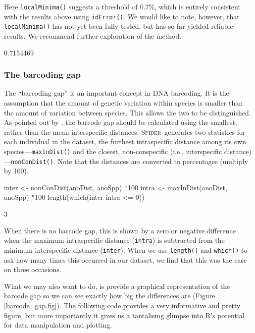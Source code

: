 \documentclass{article}
\newcommand{\spider}{\textsc{Spider}~} %
\newcommand{\fun}[1]{\texttt{#1}}
\begin{document}
Here \fun{localMinima()} suggests a threshold of 0.7\%, which is entirely consistent with the results above using \fun{idError()}. We would like to note, however, that \fun{localMinima()} has not yet been fully tested, but has so far yielded reliable results. We recommend further exploration of the method.


\begin{Routput}
[1] 0.7154469
\end{Routput}


\subsubsection{The barcoding gap}

The ``barcoding gap'' \citep{Meye.Paul.2005} is an important concept in DNA barcoding. It is the assumption that the amount of genetic variation within species is smaller than the amount of variation between species. This allows the two to be distinguished. As pointed out by \citet{Meier2008}, the barcode gap should be calculated using the smallest, rather than the mean interspecific distances. \spider generates two statistics for each individual in the dataset, the furthest intraspecific distance among its own species---\fun{maxInDist()} and the closest, non-conspecific (i.e., interspecific distance)---\fun{nonConDist()}. Note that the distances are converted to percentages (multiply by 100).

\begin{console}
inter <- nonConDist(anoDist, anoSpp) *100
intra <- maxInDist(anoDist, anoSpp) *100
length(which(inter-intra <= 0))
\end{console}

\begin{Routput}
[1] 3
\end{Routput}

When there is no barcode gap, this is shown by a zero or negative difference when the maximum intraspecific distance (\fun{intra}) is subtracted from the minimum interspecific distance (\fun{inter}). When we use \fun{length()} and \fun{which()} to ask how many times this occurred in our dataset, we find that this was the case on three occasions.

What we may also want to do, is provide a graphical representation of the barcode gap so we can see exactly how big the differences are (Figure \ref{barcode_gap.fig}). The following code provides a very informative and pretty figure, but more importantly it gives us a tantalising glimpse into R's potential for data manipulation and plotting. 
\end{document}
